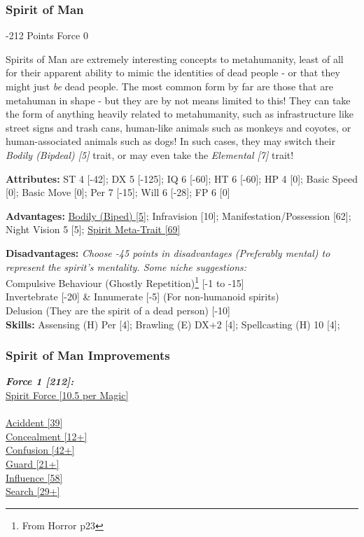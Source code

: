 \begin{multicols*}{3}
	\subsubsection{Spirit of Man}
	\begin{flushright}
		-212 Points Force 0
	\end{flushright}
	
	Spirits of Man are extremely interesting concepts to metahumanity, least of all for their apparent ability to mimic the identities of dead people - or that they might just \textit{be} dead people. The most common form by far are those that are metahuman in shape - but they are by not means limited to this! They can take the form of anything heavily related to metahumanity, such as infrastructure like street signs and trash cans, human-like animals such as monkeys and coyotes, or human-associated animals such as dogs! In such cases, they may switch their \textit{Bodily (Bipdeal) [5]} trait, or may even take the \textit{Elemental [7]} trait!
	
	\textbf{Attributes:}
	ST 4 [-42]; DX 5 [-125]; IQ 6 [-60]; HT 6 [-60]; HP 4 [0]; Basic Speed  [0]; Basic Move  [0]; Per 7 [-15]; Will 6 [-28]; FP 6 [0]
	
	\textbf{Advantages:}
	\hyperref[bodily]{Bodily (Biped) [5]}; Infravision [10]; Manifestation/Possession [62]; Night Vision 5 [5];  \hyperref[spirit_meta_trait]{Spirit Meta-Trait [69]}
	
	\textbf{Disadvantages:}
	\textit{Choose -45 points in disadvantages (Preferably mental) to represent the spirit's mentality. Some niche suggestions:\\}
	Compulsive Behaviour (Ghostly Repetition)\footnote{From Horror p23} [-1 to -15]\\
	Invertebrate [-20] \& Innumerate [-5] (For non-humanoid spirits)\\
	Delusion (They are the spirit of a dead person) [-10]\\
	
	\textbf{Skills:}
	Assensing (H) Per [4]; Brawling (E) DX+2 [4]; Spellcasting (H) 10 [4];
	
	\subsubsection*{Spirit of Man Improvements}
	
	\textbf{\textit{Force 1 [212]:\\}}
	\hyperref[spirit_force]{Spirit Force [10.5 per Magic]}\\\\
	\hyperref[accident]{Aciddent [39]}\\
	\hyperref[concealment]{Concealment [12+]}\\
	\hyperref[confusion]{Confusion [42+]}\\
	\hyperref[guard]{Guard [21+]}\\
	\hyperref[influence]{Influence [58]}\\
	\hyperref[search]{Search [29+]}\\
	

\end{multicols*}
